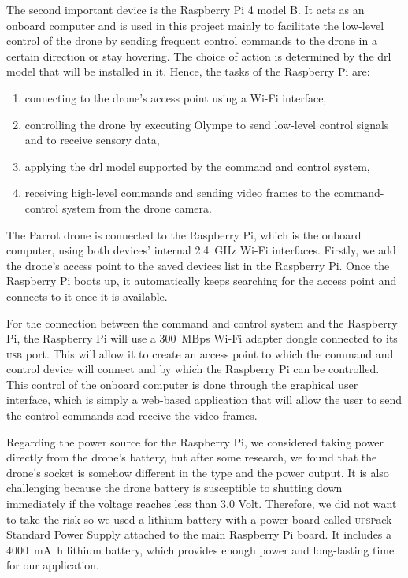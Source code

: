 \documentclass[../main.tex]{subfiles}
\begin{document}
The second important device is the Raspberry Pi 4 model B. It 
acts as an onboard computer and is used in this project
mainly to facilitate the low-level control of the drone
by sending frequent control commands to the drone
in a certain direction or stay hovering.
The choice of action is determined by the \gls{drl}
model that will be installed in it.
Hence, the tasks of the Raspberry Pi are: 

\begin{enumerate}
	\item connecting to the drone's access point 
	using a Wi-Fi interface,
	\item controlling the drone 
	by executing Olympe to send low-level control signals 
	and to receive sensory data,
	\item applying the \gls{drl} model supported by 
	the command and control system,
	\item receiving high-level commands and sending video 
	frames to the command-control system from the drone camera.
\end{enumerate}
 
The Parrot \anafi drone is connected 
to the Raspberry Pi, which is the onboard computer,
using both devices' internal 
\SI{2.4}{\giga\hertz}
Wi-Fi interfaces. 
Firstly, we add the \anafi drone's access point 
to the saved devices list in the Raspberry Pi.
Once the Raspberry Pi boots up, it automatically keeps 
searching for the access point and connects 
to it once it is available.

For the connection between the command and control system 
and the Raspberry Pi, 
the Raspberry Pi will use a 
\SI[per-mode=symbol,per-symbol=p]{300}{MBps} 
Wi-Fi adapter dongle connected to 
its \textsc{usb} port. 
This will allow it to create an access point to which 
the command and control device will connect and by which 
the Raspberry Pi can be controlled. This control of the 
onboard computer is done through the graphical user interface,
which is simply a web-based application 
that will allow the user to send the
control commands and receive the video frames. 

Regarding the power source for the Raspberry Pi, 
we considered taking power directly from the 
drone's battery, but after some research, we found 
that the \anafi drone's  
socket is somehow different in the type and the power output. It is also challenging 
because the drone battery is susceptible to shutting down 
immediately if the voltage reaches less than 3.0 Volt. 
Therefore, we did not want to take the risk so we used a 
lithium battery with a power board called 
\textsc{upsp}ack Standard Power Supply attached to 
the main Raspberry Pi board. It includes a 
\SI{4000}{\milli\ampere\hour}
lithium battery, which provides enough power 
and long-lasting time for our application.
\end{document}
